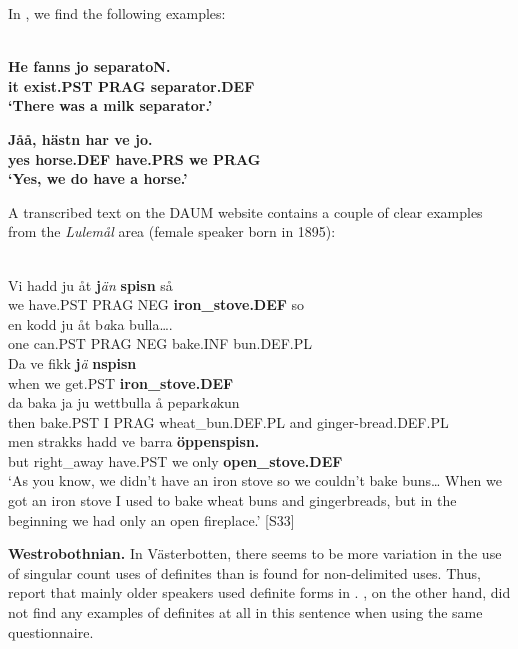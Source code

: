 In \citet{Stenberg1971}, we find the following examples:

\ea\label{}
\\
\gll\bfseries
He  fanns  jo  separatoN.\\
\bfseries
it  exist.PST  PRAG  separator.DEF\\
\glt ‘There was a milk separator.’ 

\z

\ea\gll\bfseries
Jåå,  hästn  har  ve  jo.\\
\bfseries
yes  horse.DEF  have.PRS  we  PRAG\\
\glt ‘Yes, we do have a horse.’ 

\z

A transcribed text on the DAUM website contains a couple of clear examples from the \textit{Lulemål} area (female speaker born in 1895):

\ea \label{} 
\\
\gll Vi  hadd  ju  åt  \textbf{j}\textit{än} \textbf{spisn} så\\
we  have.PST  PRAG  NEG  \textbf{iron\_stove.DEF} so\\
\gll en  kodd  ju  åt  b\textit{a}ka  bulla….\\
one  can.PST  PRAG  NEG  bake.INF  bun.DEF.PL\\
\gll Da  ve  fikk  \textbf{j}\textit{ä} \textbf{nspisn}\\
when  we  get.PST  \textbf{iron\_stove.DEF}\\
\gll da  baka  ja  ju  wettbulla  å  pepark\textit{a}kun\\
then  bake.PST  I  PRAG  wheat\_bun.DEF.PL  and  ginger-bread.DEF.PL\\
\gll men  strakks  hadd  ve  barra  \textbf{öppenspisn.}\\
but  right\_away  have.PST  we  only  \textbf{open\_stove.DEF}\\
\glt ‘As you know, we didn’t have an iron stove so we couldn’t bake buns… When we got an iron stove I used to bake wheat buns and gingerbreads, but in the beginning we had only an open fireplace.’ [S33]

\z

\textbf{Westrobothnian.} In Västerbotten, there seems to be more variation in the use of singular count uses of definites than is found for non-delimited uses. Thus, \citet{BergholmEtAl1999} report that mainly older speakers used definite forms in . \citet{WälchliEtAl1998}, on the other hand, did not find any examples of definites at all in this sentence when using the same questionnaire.

